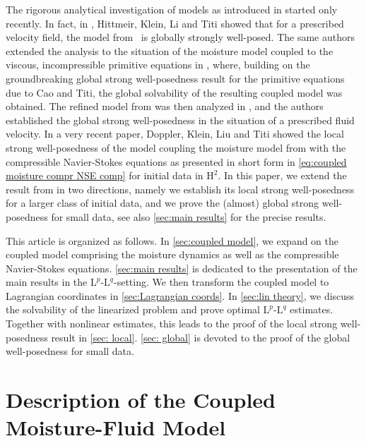 \documentclass[10pt]{amsart}
\theoremstyle{plain}
\theoremstyle{definition}
\theoremstyle{thm}
\numberwithin{equation}{section}
\newcommand{\rL}{\mathrm{L}}
\newcommand{\rH}{\mathrm{H}}
\begin{document}
The rigorous analytical investigation of models as introduced in \cite{HK:18,KM:06} started only recently.
In fact, in \cite{HKLT:17}, Hittmeir, Klein, Li and Titi showed that for a prescribed velocity field, the model from~\cite{KM:06} is globally strongly well-posed.
The same authors extended the analysis to the situation of the moisture model coupled to the viscous, incompressible primitive equations in \cite{HKLT:20}, where, building on the groundbreaking global strong well-posedness result for the primitive equations due to Cao and Titi\cite{CT:07}, the global solvability of the resulting coupled model was obtained.
The refined model from \cite{HK:18} was then analyzed in \cite{HKLT:23}, and the authors established the global strong well-posedness in the situation of a prescribed fluid velocity.
In a very recent paper, Doppler, Klein, Liu and Titi\cite{DKLT:24} showed the local strong well-posedness of the model coupling the moisture model from \cite{HK:18} with the compressible Navier-Stokes equations as presented in short form in \eqref{eq:coupled moisture compr NSE comp} for initial data in $\rH^2$.
In this paper, we extend the result from \cite{DKLT:24} in two directions, namely we establish its local strong well-posedness for a larger class of initial data, and we prove the (almost) global strong well-posedness for small data, see also \autoref{sec:main results} for the precise results.

This article is organized as follows.
In \autoref{sec:coupled model}, we expand on the coupled model comprising the moisture dynamics as well as the compressible Navier-Stokes equations.
\autoref{sec:main results} is dedicated to the presentation of the main results in the $\rL^p$-$\rL^q$-setting.
We then transform the coupled model to Lagrangian coordinates in \autoref{sec:Lagrangian coords}.
In \autoref{sec:lin theory}, we discuss the solvability of the linearized problem and prove optimal $\rL^p$-$\rL^q$ estimates.
Together with nonlinear estimates, this leads to the proof of the local strong well-posedness result in \autoref{sec: local}.
\autoref{sec: global} is devoted to the proof of the global well-posedness for small data.



\section{Description of the Coupled Moisture-Fluid Model}\label{sec:coupled model}
\end{document}
